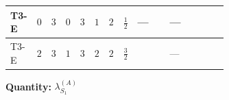 \documentclass[8pt]{article}
\begin{document}
\begin{landscape}
\begin{longtable}{@{}llcccccc >{\raggedright\arraybackslash}p{0.21\linewidth} >{\raggedright\arraybackslash}p{0.21\linewidth} >{\raggedright\arraybackslash}p{0.21\linewidth}@{}}
\midrule
T3-E & $0$ & $3$ & $0$ & $3$ & $1$ & $2$ & $\frac{1}{2}$ & --- & --- & \scriptsize\adjustbox{max width=\linewidth}{$\begin{gathered} +\frac{{\lambda_{HS_1}^{(1)}}^2}{2}\end{gathered}$} \\
\midrule
T3-E & $2$ & $3$ & $1$ & $3$ & $2$ & $2$ & $\frac{3}{2}$ & \scriptsize\adjustbox{max width=\linewidth}{$\begin{gathered} +\frac{3 {g_1}^4}{2}\end{gathered}$} & --- & \scriptsize\adjustbox{max width=\linewidth}{$\begin{gathered} +\frac{{\lambda_{HS_1}^{(1)}}^2}{2}\end{gathered}$} \\
\midrule
\bottomrule
\end{longtable}
\clearpage
\noindent\textbf{Quantity: }$\lambda_{S_1}^{(A)}$\par\smallskip

\end{landscape}
\end{document}
